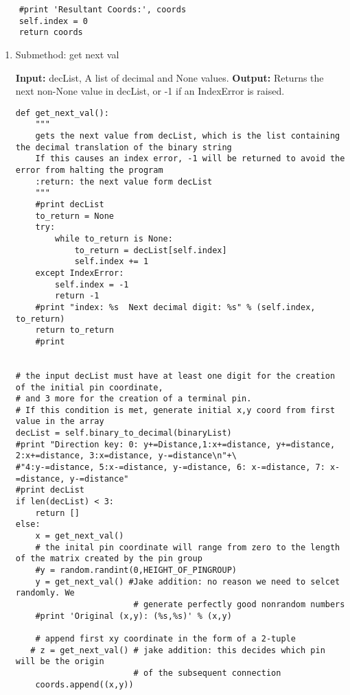 \documentclass[a4paper]{article}
\begin{document}
\begin{enumerate}
\begin{verbatim}
    #print 'Resultant Coords:', coords
    self.index = 0
    return coords
\end{verbatim}
\begin{enumerate}
\item Submethod: get next val
\label{sec-5-2-1-3-1}

\textbf{Input:} decList, A list of decimal and None values.    
\textbf{Output:} Returns the next non-None value in decList, or -1 if an IndexError is raised.
\begin{verbatim}
def get_next_val():
    """
    gets the next value from decList, which is the list containing the decimal translation of the binary string
    If this causes an index error, -1 will be returned to avoid the error from halting the program
    :return: the next value form decList
    """
    #print decList
    to_return = None
    try:
        while to_return is None:
            to_return = decList[self.index]
            self.index += 1
    except IndexError:
        self.index = -1
        return -1
    #print "index: %s  Next decimal digit: %s" % (self.index, to_return) 
    return to_return
    #print


# the input decList must have at least one digit for the creation of the initial pin coordinate,
# and 3 more for the creation of a terminal pin.
# If this condition is met, generate initial x,y coord from first value in the array
decList = self.binary_to_decimal(binaryList)
#print "Direction key: 0: y+=Distance,1:x+=distance, y+=distance, 2:x+=distance, 3:x=distance, y-=distance\n"+\
#"4:y-=distance, 5:x-=distance, y-=distance, 6: x-=distance, 7: x-=distance, y-=distance"
#print decList
if len(decList) < 3:
    return []
else:
    x = get_next_val()
    # the inital pin coordinate will range from zero to the length of the matrix created by the pin group
    #y = random.randint(0,HEIGHT_OF_PINGROUP)
    y = get_next_val() #Jake addition: no reason we need to selcet randomly. We 
                        # generate perfectly good nonrandom numbers
    #print 'Original (x,y): (%s,%s)' % (x,y)

    # append first xy coordinate in the form of a 2-tuple
   # z = get_next_val() # jake addition: this decides which pin will be the origin
                        # of the subsequent connection
    coords.append((x,y))


\end{verbatim}
\end{enumerate}
\end{enumerate}
\end{document}
